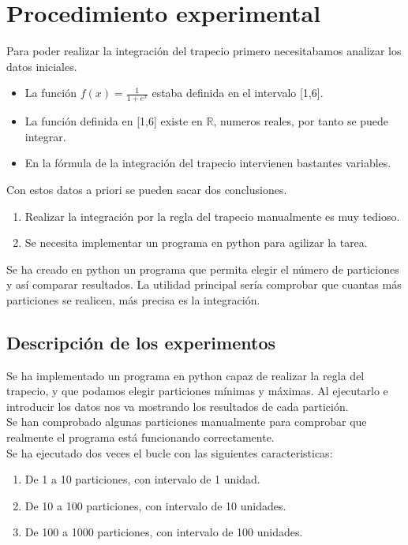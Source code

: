\documentclass{article}
\begin{document}
   \section{Procedimiento experimental}
   Para poder realizar la integración del trapecio primero necesitabamos analizar los datos iniciales.
   \begin{itemize}
    \item La función $f(x)=\frac{1}{1+e^x}$ estaba definida en el intervalo [1,6].
    \item La función definida en [1,6] existe en $\mathbb{R}$, numeros reales, por tanto se puede integrar.
    \item En la fórmula de la integración del trapecio intervienen bastantes variables.
   \end{itemize}
   Con estos datos a priori se pueden sacar dos conclusiones.
     \begin{enumerate}
       \item Realizar la integración por la regla del trapecio manualmente es muy tedioso.
       \item Se necesita implementar un programa en python para agilizar la tarea.
     \end{enumerate}

   Se ha creado en python un programa que permita elegir el número de particiones y así comparar resultados. La utilidad principal sería comprobar que cuantas más particiones se realicen, más precisa es la integración.
    
    \subsection{Descripción de los experimentos}

   Se ha implementado un programa en python capaz de realizar la regla del trapecio, y que podamos elegir particiones mínimas y máximas. Al ejecutarlo e introducir los datos nos va mostrando los resultados de cada partición.\\

   Se han comprobado algunas particiones manualmente para comprobar que realmente el programa está funcionando correctamente.\\

   Se ha ejecutado dos veces el bucle con las siguientes caracteristicas:
 
   \begin{enumerate}
     \item De 1 a 10 particiones, con intervalo de 1 unidad.
     \item De 10 a 100 particiones, con intervalo de 10 unidades.
     \item De 100 a 1000 particiones, con intervalo de 100 unidades.
   \end{enumerate}
\end{document}
